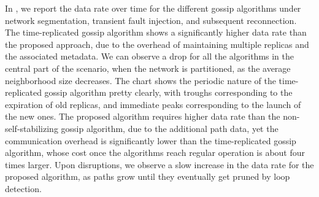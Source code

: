 \documentclass[runningheads]{llncs}
\begin{document}
In ,
we report the data rate over time for the different gossip algorithms under network segmentation,
transient fault injection,
and subsequent reconnection.
%
The time-replicated gossip algorithm shows a significantly higher data rate than the proposed approach,
due to the overhead of maintaining multiple replicas and the associated metadata.
%
We can observe a drop for all the algorithms in the central part of the scenario,
when the network is partitioned,
as the average neighborhood size decreases.
%
The chart shows the periodic nature of the time-replicated gossip algorithm pretty clearly,
with troughs corresponding to the expiration of old replicas, and immediate peaks corresponding to the launch of the new ones.
%
The proposed algorithm requires higher data rate than the non-self-stabilizing gossip algorithm,
due to the additional path data,
yet the communication overhead is significantly lower than the time-replicated gossip algorithm,
whose cost once the algorithms reach regular operation is about four times larger.
%
Upon disruptions, we observe a slow increase in the data rate for the proposed algorithm,
as paths grow until they eventually get pruned by loop detection.

%
%
%
%
%
%
%
%
%
\end{document}
